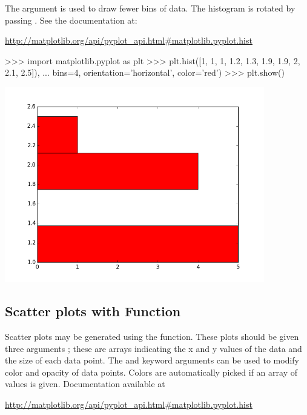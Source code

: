 \documentclass[11pt]{cselabheader}
\begin{document}
The  argument is used to draw fewer bins of
data. The histogram is rotated by passing
. See the documentation at:

\begin{center}
\url{http://matplotlib.org/api/pyplot_api.html#matplotlib.pyplot.hist}
\end{center}

\begin{pyconcode}
>>> import matplotlib.pyplot as plt
>>> plt.hist([1, 1, 1, 1.2, 1.3, 1.9, 1.9, 2, 2.1, 2.5]),
...          bins=4, orientation='horizontal', color='red')
>>> plt.show()
\end{pyconcode}

\begin{center}
\includegraphics[width=0.85\textwidth]{img/matplotlib_hist2.png}
\end{center}

\subsection{Scatter plots with  Function}

Scatter plots may be generated using the 
function.  These plots should be given three arguments
; these are arrays indicating the x and y values
of the data and the size of each data point.  The  and
 keyword arguments can be used to modify color and
opacity of data points. Colors are automatically picked if an array of
values is given. Documentation available at

\begin{center}
\url{http://matplotlib.org/api/pyplot_api.html#matplotlib.pyplot.hist}
\end{center}
\end{document}
